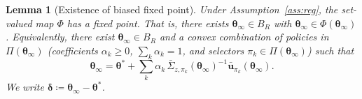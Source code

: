 \documentclass[11pt]{article}
\newtheorem{lemma}[theorem]{Lemma}
\begin{document}
\begin{lemma}[Existence of biased fixed point]\label{lem:fp}
Under Assumption~\ref{ass:reg}, the set-valued map $\Phi$ has a fixed
point. That is, there exists $\bm{\theta}_\infty\in B_R$ with
$\bm{\theta}_\infty\in\Phi(\bm{\theta}_\infty)$.
Equivalently, there exist $\bm{\theta}_\infty\in B_R$ and a
\emph{convex combination} of policies in $\Pi(\bm{\theta}_\infty)$
(coefficients $\alpha_k\geq 0$, $\sum_k\alpha_k=1$, and
selectors $\pi_k\in\Pi(\bm{\theta}_\infty)$) such that
\begin{equation}
\bm{\theta}_\infty=\bm{\theta}^{\!*}+
\sum_k\alpha_k\,\bar{\Sigma}_{z,\pi_k}(\bm{\theta}_\infty)^{-1}
\bar{\bm{u}}_{\pi_k}(\bm{\theta}_\infty).
\label{eq:fp_conv}
\end{equation}
We write $\bm{\delta}\coloneqq\bm{\theta}_\infty-\bm{\theta}^{\!*}$.
\end{lemma}
\end{document}
